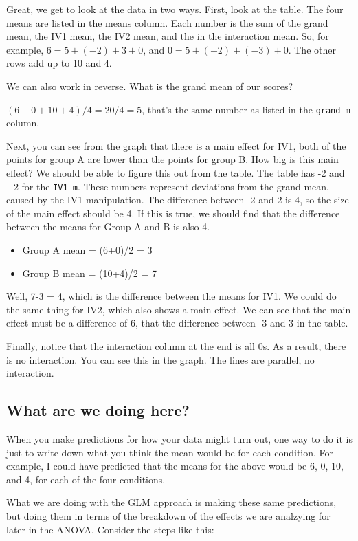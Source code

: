 \documentclass[
]{book}
\begin{document}
Great, we get to look at the data in two ways. First, look at the table. The four means are listed in the means column. Each number is the sum of the grand mean, the IV1 mean, the IV2 mean, and the in the interaction mean. So, for example, \(6 = 5 + (-2) + 3 + 0\), and \(0 = 5 + (-2) + (-3) + 0\). The other rows add up to 10 and 4.

We can also work in reverse. What is the grand mean of our scores?

\((6+0+10+4)/4 =20/4 = 5\), that's the same number as listed in the \texttt{grand\_m} column.

Next, you can see from the graph that there is a main effect for IV1, both of the points for group A are lower than the points for group B. How big is this main effect? We should be able to figure this out from the table. The table has -2 and +2 for the \texttt{IV1\_m}. These numbers represent deviations from the grand mean, caused by the IV1 manipulation. The difference between -2 and 2 is 4, so the size of the main effect should be 4. If this is true, we should find that the difference between the means for Group A and B is also 4.

\begin{itemize}
\item
  Group A mean = (6+0)/2 = 3
\item
  Group B mean = (10+4)/2 = 7
\end{itemize}

Well, 7-3 = 4, which is the difference between the means for IV1. We could do the same thing for IV2, which also shows a main effect. We can see that the main effect must be a difference of 6, that the difference between -3 and 3 in the table.

Finally, notice that the interaction column at the end is all 0s. As a result, there is no interaction. You can see this in the graph. The lines are parallel, no interaction.

\subsection{What are we doing here?}\label{what-are-we-doing-here}

When you make predictions for how your data might turn out, one way to do it is just to write down what you think the mean would be for each condition. For example, I could have predicted that the means for the above would be 6, 0, 10, and 4, for each of the four conditions.

What we are doing with the GLM approach is making these same predictions, but doing them in terms of the breakdown of the effects we are analzying for later in the ANOVA. Consider the steps like this:
\end{document}

